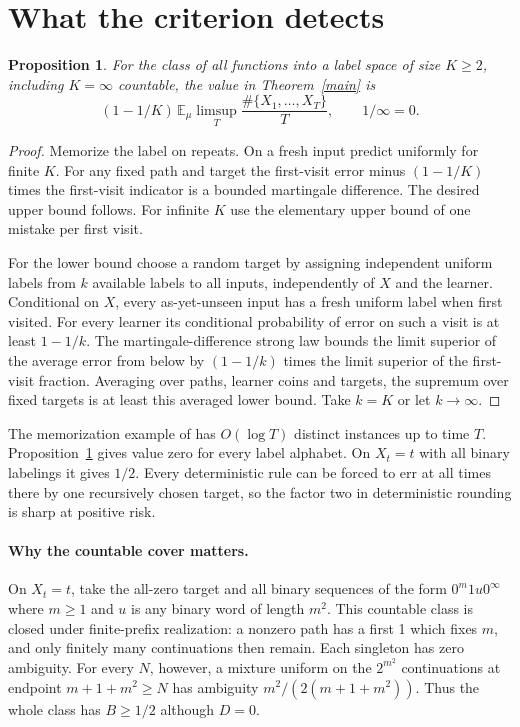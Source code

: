 \documentclass[11pt]{article}
\newtheorem{proposition}[theorem]{Proposition}
\newcommand{\E}{\mathbb E}
\begin{document}
\section{What the criterion detects}
\begin{proposition}\label{all}
For the class of all functions into a label space of size $K\ge2$, including $K=\infty$ countable, the value in Theorem~\ref{main} is
\[
 (1-1/K)\,\E_\mu\limsup_T\frac{\#\{X_1,\ldots,X_T\}}{T},
 \qquad 1/\infty=0.
\]
\end{proposition}
\begin{proof}
Memorize the label on repeats. On a fresh input predict uniformly for finite $K$. For any fixed path and target the first-visit error minus $(1-1/K)$ times the first-visit indicator is a bounded martingale difference. The desired upper bound follows. For infinite $K$ use the elementary upper bound of one mistake per first visit.

For the lower bound choose a random target by assigning independent uniform labels from $k$ available labels to all inputs, independently of $X$ and the learner. Conditional on $X$, every as-yet-unseen input has a fresh uniform label when first visited. For every learner its conditional probability of error on such a visit is at least $1-1/k$. The martingale-difference strong law bounds the limit superior of the average error from below by $(1-1/k)$ times the limit superior of the first-visit fraction. Averaging over paths, learner coins and targets, the supremum over fixed targets is at least this averaged lower bound. Take $k=K$ or let $k\to\infty$.
\end{proof}

The memorization example of \cite[Appendix D.1]{hw} has $O(\log T)$ distinct instances up to time $T$. Proposition~\ref{all} gives value zero for every label alphabet. On $X_t=t$ with all binary labelings it gives $1/2$. Every deterministic rule can be forced to err at all times there by one recursively chosen target, so the factor two in deterministic rounding is sharp at positive risk.

\paragraph{Why the countable cover matters.}
On $X_t=t$, take the all-zero target and all binary sequences of the form $0^{m}1u0^\infty$ where $m\ge1$ and $u$ is any binary word of length $m^2$. This countable class is closed under finite-prefix realization: a nonzero path has a first 1 which fixes $m$, and only finitely many continuations then remain. Each singleton has zero ambiguity. For every $N$, however, a mixture uniform on the $2^{m^2}$ continuations at endpoint $m+1+m^2\ge N$ has ambiguity $m^2/(2(m+1+m^2))$. Thus the whole class has $B\ge1/2$ although $D=0$.
\end{document}
